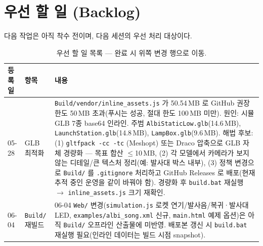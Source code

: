 \documentclass[11pt, oneside]{article}
\begin{document}
\section*{우선 할 일 (Backlog)}

다음 작업은 아직 착수 전이며, 다음 세션의 우선 처리 대상이다.

\begin{table}[h]
\centering
\small
\begin{tabularx}{\linewidth}{@{}llX@{}}
\toprule
등록일 & 항목 & 내용 \\
\midrule
05-28 & GLB 최적화 & \texttt{Build/vendor/inline\_assets.js} 가 50.54\,MB 로 GitHub 권장 한도 50\,MB 초과(푸시는 성공, 절대 한도 100\,MB 미만). 원인: 시뮬 GLB 7종 base64 인라인. 주범 \texttt{AlbiStaticLow.glb}(14.6\,MB), \texttt{LaunchStation.glb}(14.8\,MB), \texttt{LampBox.glb}(9.6\,MB). 해법 후보: (1) \texttt{gltfpack -cc -tc} (Meshopt) 또는 Draco 압축으로 GLB 자체 경량화 — 목표 합산 $\le$10\,MB, (2) 각 모델에서 카메라가 보지 않는 디테일/큰 텍스처 정리(예: 발사대 박스 내부), (3) 정책 변경으로 \texttt{Build/} 를 \texttt{.gitignore} 처리하고 GitHub Releases 로 배포(현재 추적 중인 운영을 같이 바꿔야 함). 경량화 후 \texttt{build.bat} 재실행 $\to$ \texttt{inline\_assets.js} 크기 재확인. \\
\midrule
06-04 & \texttt{Build/} 재빌드 & 06-04 \texttt{Web/} 변경(\texttt{simulation.js} 로켓 연기/발사음/복귀·발사대 LED, \texttt{examples/albi\_song.xml} 신규, \texttt{main.html} 예제 옵션)은 아직 \texttt{Build/} 오프라인 산출물에 미반영. 배포본 갱신 시 \texttt{build.bat} 재실행 필요(인라인 데이터는 빌드 시점 snapshot). \\
\bottomrule
\end{tabularx}
\caption{우선 할 일 목록 — 완료 시 위쪽 변경 행으로 이동.}
\end{table}
\end{document}

